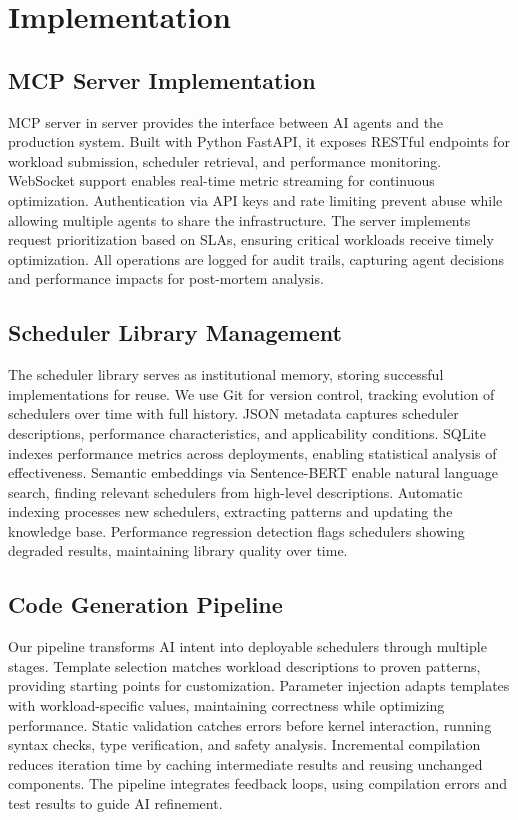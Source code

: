 \section{Implementation}

\subsection{MCP Server Implementation}

MCP server in \sys server provides the interface between AI agents and the production system. Built with Python FastAPI, it exposes RESTful endpoints for workload submission, scheduler retrieval, and performance monitoring. WebSocket support enables real-time metric streaming for continuous optimization. Authentication via API keys and rate limiting prevent abuse while allowing multiple agents to share the infrastructure. The server implements request prioritization based on SLAs, ensuring critical workloads receive timely optimization. All operations are logged for audit trails, capturing agent decisions and performance impacts for post-mortem analysis.

\subsection{Scheduler Library Management}

The scheduler library serves as institutional memory, storing successful implementations for reuse. We use Git for version control, tracking evolution of schedulers over time with full history. JSON metadata captures scheduler descriptions, performance characteristics, and applicability conditions. SQLite indexes performance metrics across deployments, enabling statistical analysis of effectiveness. Semantic embeddings via Sentence-BERT enable natural language search, finding relevant schedulers from high-level descriptions. Automatic indexing processes new schedulers, extracting patterns and updating the knowledge base. Performance regression detection flags schedulers showing degraded results, maintaining library quality over time.

\subsection{Code Generation Pipeline}

Our pipeline transforms AI intent into deployable schedulers through multiple stages. Template selection matches workload descriptions to proven patterns, providing starting points for customization. Parameter injection adapts templates with workload-specific values, maintaining correctness while optimizing performance. Static validation catches errors before kernel interaction, running syntax checks, type verification, and safety analysis. Incremental compilation reduces iteration time by caching intermediate results and reusing unchanged components. The pipeline integrates feedback loops, using compilation errors and test results to guide AI refinement.

